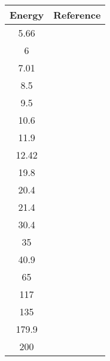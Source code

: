 \begin{tabular}{c c} 
    \toprule
    \bf{Energy} & \bf{Reference} \\
    \midrule
    5.66 & \cite{Blue1965}\\
    6 & \cite{Blue1965}\\
    7.01 & \cite{Blue1965}\\
    8.5 & \cite{Blue1965}\\
    9.5 & \cite{Blue1965}\\
    10.6 & \cite{Prior1971}\\
    11.9 & \cite{Blue1965}\\
    12.42 & \cite{Prior1971}\\
    19.8 & \cite{Karban1969}\\
    20.4 & \cite{Karban1969}\\
    21.4 & \cite{Karban1969}\\
    30.4 & \cite{Greaves1972}\\
    35 & \cite{Ohnuma1990}\\
    40.9 & \cite{Alvarez1982}\\
    65 & \cite{Sakaguchi1982}\\
    117 & \cite{Hillman1957}\\
    135 & \cite{Kelly1989}\\
    179.9 & \cite{Kelly1990}\\
    200 & \cite{Glover1985}\\
    \bottomrule
\end{tabular}
